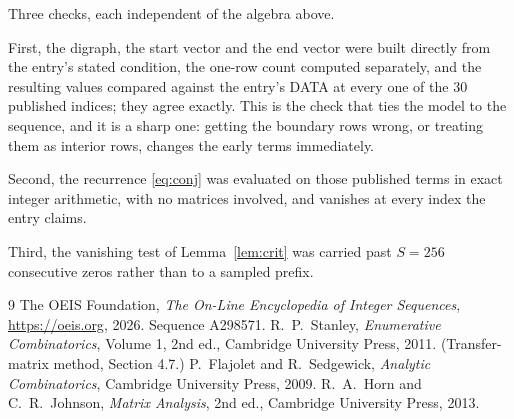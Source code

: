 \documentclass[11pt,a4paper]{article}
\theoremstyle{plain}
\theoremstyle{definition}
\begin{document}
Three checks, each independent of the algebra above.

First, the digraph, the start vector and the end vector were built directly from the
entry's stated condition, the one-row count computed separately, and the resulting values
compared against the entry's DATA at every one of the $30$ published indices; they
agree exactly. This is the check that ties the model to the sequence, and it is a sharp one:
getting the boundary rows wrong, or treating them as interior rows, changes the early terms
immediately.

Second, the recurrence \eqref{eq:conj} was evaluated on those published terms in exact
integer arithmetic, with no matrices involved, and vanishes at every index the entry claims.

Third, the vanishing test of Lemma~\ref{lem:crit} was carried past $S=256$ consecutive
zeros rather than to a sampled prefix.

\begin{thebibliography}{9}
 The OEIS Foundation, \emph{The On-Line Encyclopedia of Integer
Sequences}, \url{https://oeis.org}, 2026. Sequence A298571.
 R.~P.~Stanley, \emph{Enumerative Combinatorics}, Volume 1, 2nd ed.,
Cambridge University Press, 2011. (Transfer-matrix method, Section 4.7.)
 P.~Flajolet and R.~Sedgewick, \emph{Analytic Combinatorics}, Cambridge
University Press, 2009.
 R.~A.~Horn and C.~R.~Johnson, \emph{Matrix Analysis}, 2nd ed., Cambridge
University Press, 2013.
\end{thebibliography}
\end{document}
